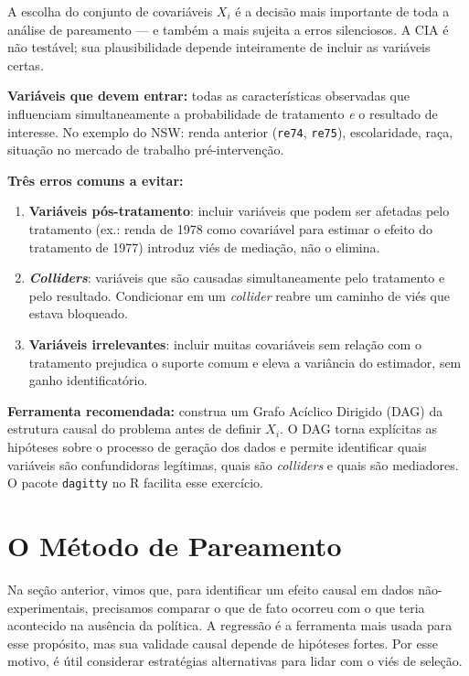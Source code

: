 \documentclass[12pt,a4paper]{article}
\begin{document}
\begin{notabox}
A escolha do conjunto de covariáveis $X_i$ é a decisão mais importante de toda a análise de pareamento --- e também a mais sujeita a erros silenciosos. A CIA é não testável; sua plausibilidade depende inteiramente de incluir as variáveis certas.

\textbf{Variáveis que devem entrar:} todas as características observadas que influenciam simultaneamente a probabilidade de tratamento \textit{e} o resultado de interesse. No exemplo do NSW: renda anterior (\texttt{re74}, \texttt{re75}), escolaridade, raça, situação no mercado de trabalho pré-intervenção.

\textbf{Três erros comuns a evitar:}
\begin{enumerate}[leftmargin=1.5em, itemsep=2pt]
  \item \textbf{Variáveis pós-tratamento}: incluir variáveis que podem ser afetadas pelo tratamento (ex.: renda de 1978 como covariável para estimar o efeito do tratamento de 1977) introduz viés de mediação, não o elimina.
  \item \textbf{\textit{Colliders}}: variáveis que são causadas simultaneamente pelo tratamento e pelo resultado. Condicionar em um \textit{collider} reabre um caminho de viés que estava bloqueado.
  \item \textbf{Variáveis irrelevantes}: incluir muitas covariáveis sem relação com o tratamento prejudica o suporte comum e eleva a variância do estimador, sem ganho identificatório.
\end{enumerate}

\textbf{Ferramenta recomendada:} construa um Grafo Acíclico Dirigido (DAG) da estrutura causal do problema antes de definir $X_i$. O DAG torna explícitas as hipóteses sobre o processo de geração dos dados e permite identificar quais variáveis são confundidoras legítimas, quais são \textit{colliders} e quais são mediadores. O pacote \texttt{dagitty} no R facilita esse exercício.
\end{notabox}

\newpage
\section{O Método de Pareamento}\label{sec:pareamento}

Na seção anterior, vimos que, para identificar um efeito causal em dados não-experimentais, precisamos comparar o que de fato ocorreu com o que teria acontecido na ausência da política. A regressão é a ferramenta mais usada para esse propósito, mas sua validade causal depende de hipóteses fortes. Por esse motivo, é útil considerar estratégias alternativas para lidar com o viés de seleção.
\end{document}
